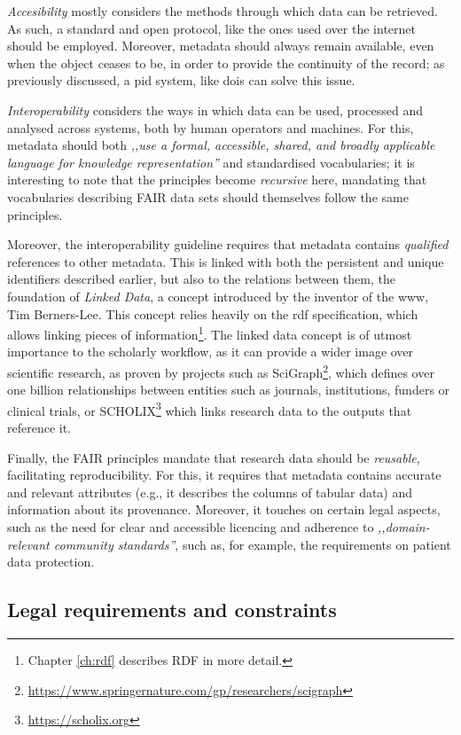 \emph{Accesibility} mostly considers the methods through which data can be retrieved. As such, a standard and open protocol, like the ones used over the internet should be employed. Moreover, metadata should always remain available, even when the object ceases to be, in order to provide the continuity of the record; as previously discussed, a \gls{pid} system, like \glspl{doi} can solve this issue.

\emph{Interoperability} considers the ways in which data can be used, processed and analysed across systems, both by human operators and machines. For this, metadata should both \emph{,,use a formal, accessible, shared, and broadly applicable language for knowledge representation''}\cite{fair} and standardised vocabularies; it is interesting to note that the principles become \emph{recursive} here, mandating that vocabularies describing FAIR data sets should themselves follow the same principles.

Moreover, the interoperability guideline requires that metadata contains \emph{qualified} references to other metadata. This is linked with both the persistent and unique identifiers described earlier, but also to the relations between them, the foundation of \emph{Linked Data}, a concept introduced by the inventor of the \gls{www}, Tim Berners-Lee. This concept relies heavily on the \gls{rdf} specification\cite{rdf}, which allows linking pieces of information\footnote{Chapter \ref{ch:rdf} describes RDF in more detail.}. The linked data concept is of utmost importance to the scholarly workflow, as it can provide a wider image over scientific research, as proven by projects such as SciGraph\footnote{\url{https://www.springernature.com/gp/researchers/scigraph}}, which defines over one billion relationships between entities such as journals, institutions, funders or clinical trials, or SCHOLIX\footnote{\url{https://scholix.org}} which links research data to the outputs that reference it.
 
 Finally, the FAIR principles mandate that research data should be \emph{reusable}, facilitating reproducibility. For this, it requires that metadata contains accurate and relevant attributes (e.g., it describes the columns of tabular data) and information about its provenance. Moreover, it touches on certain legal aspects, such as the need for clear and accessible licencing and adherence to \emph{,,domain-relevant community standards''}, such as, for example, the requirements on patient data protection.

\subsection{Legal requirements and constraints}
\label{subsec:legal}

